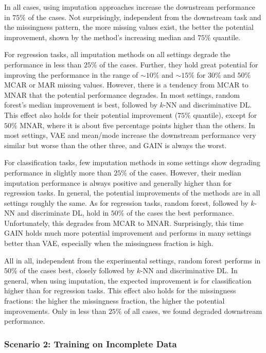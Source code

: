 \documentclass[utf8]{frontiersSCNS} %
\begin{document}
In all cases, using imputation approaches increase the downstream performance in $75\%$ of the cases. Not surprisingly, independent from the downstream task and the missingness pattern, the more missing values exist, the better the potential improvement, shown by the method's increasing median and $75\%$ quantile.

For regression tasks, all imputation methods on all settings degrade the performance in less than $25\%$ of the cases. Further, they hold great potential for improving the performance in the range of $\sim10\%$ and $\sim15\%$ for $30\%$ and $50\%$ MCAR or MAR missing values. However, there is a tendency from MCAR to MNAR that the potential performance degrades. In most settings, random forest's median improvement is best, followed by $k$-NN and discriminative DL. This effect also holds for their potential improvement ($75\%$ quantile), except for $50\%$ MNAR, where it is about five percentage points higher than the others. In most settings, VAE and mean/mode increase the downstream performance very similar but worse than the other three, and GAIN is always the worst.

For classification tasks, few imputation methods in some settings show degrading performance in slightly more than $25\%$ of the cases. However, their median imputation performance is always positive and generally higher than for regression tasks. In general, the potential improvements of the methods are in all settings roughly the same. As for regression tasks, random forest, followed by $k$-NN and discriminate DL, hold in $50\%$ of the cases the best performance. Unfortunately, this degrades from MCAR to MNAR. Surprisingly, this time GAIN holds much more potential improvement and performs in many settings better than VAE, especially when the missingness fraction is high.

All in all, independent from the experimental settings, random forest performs in $50\%$ of the cases best, closely followed by $k$-NN and discriminative DL. In general, when using imputation, the expected improvement is for classification higher than for regression tasks. This effect also holds for the missingness fractions: the higher the missingness fraction, the higher the potential improvements. Only in less than $25\%$ of all cases, we found degraded downstream performance.


\subsubsection{Scenario 2: Training on Incomplete Data}
\end{document}
